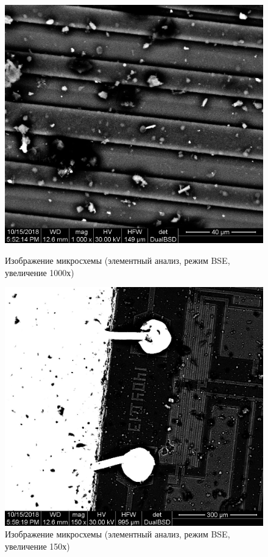 \documentclass[a4paper]{article}
\begin{document}
\begin{enumerate}
    \begin{figure}[h]
\begin{center}
\begin{minipage}[h]{0.45\linewidth}
\includegraphics[width=1\linewidth]{z1mikoch_004.jpg}
\caption{Изображение микросхемы (элементный анализ, режим BSE, увеличение 1000х)} %
\end{minipage}
\hfill 
\begin{minipage}[h]{0.45\linewidth}
\includegraphics[width=1\linewidth]{z1mikoch_007.jpg}
\caption{Изображение микросхемы (элементный анализ, режим BSE, увеличение 150х)}
\label{ris:experimcoded}
\end{minipage}
\end{center}
\end{figure}


\end{enumerate}
\end{document}
